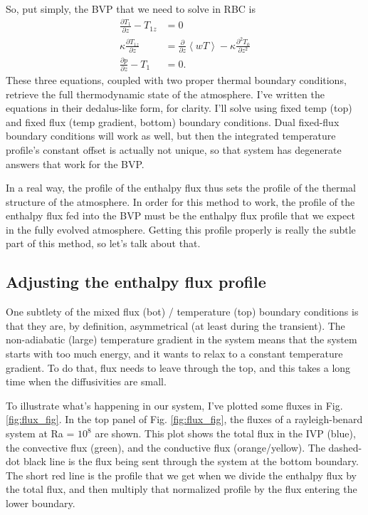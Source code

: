 \documentclass[aps, pre, onecolumn, nofootinbib, notitlepage, groupedaddress, amsfonts, amssymb, amsmath, longbibliography]{revtex4-1}
\newcommand{\angles}[1]{\ensuremath{\left\langle #1 \right\rangle}}
\begin{document}
\begin{enumerate}
So, put simply, the BVP that we need to solve in RBC is 
\begin{equation}
\begin{split}
\frac{\partial T_1}{\partial z} - T_{1z} &= 0 \\
\kappa \frac{\partial T_{1z}}{\partial z} &= \frac{\partial}{\partial z} \angles{w T}  - \kappa \frac{\partial^2 T_0}{\partial z^2}\\
\frac{\partial p}{\partial z} - T_1 &= 0.
\label{eqn:RB_BVP_eqns}
\end{split}
\end{equation}
These three equations, coupled with two proper thermal boundary conditions, retrieve the full
thermodynamic state of the atmosphere.  I've written the equations in their dedalus-like form,
for clarity.  I'll solve using fixed temp (top) and fixed flux (temp gradient, bottom) boundary
conditions.  Dual fixed-flux boundary conditions will work as well, but then the integrated temperature
profile's constant offset is actually not unique, so that system has degenerate answers that work for
the BVP.

In a real way, the profile of the enthalpy flux thus sets the profile of the thermal structure of
the atmosphere.  In order for this method to work, the profile of the enthalpy flux fed into the
BVP must be the enthalpy flux profile that we expect in the fully evolved atmosphere.  Getting
this profile properly is really the subtle part of this method, so let's talk about that.

\subsection{Adjusting the enthalpy flux profile}
One subtlety of the mixed flux (bot) / temperature (top) boundary conditions is that they are,
by definition, asymmetrical (at least during the transient).  The non-adiabatic (large) temperature
gradient in the system means that the system starts with too much energy, and it wants to relax
to a constant temperature gradient.  To do that, flux needs to leave through the top, and this takes
a long time when the diffusivities are small.

To illustrate what's happening in our system, I've plotted some fluxes in Fig. \ref{fig:flux_fig}. 
In the top panel of Fig.
\ref{fig:flux_fig}, the fluxes of a rayleigh-benard system at Ra = $10^8$ are shown.  This
plot shows the total flux in the IVP (blue), the convective flux (green), and the conductive flux
(orange/yellow).  The dashed-dot black line is the flux being sent through the system at the
bottom boundary.  The short red line is the profile that we get when we divide the enthalpy flux
by the total flux, and then multiply that normalized profile by the flux entering the lower boundary.


\end{enumerate}
\end{document}

